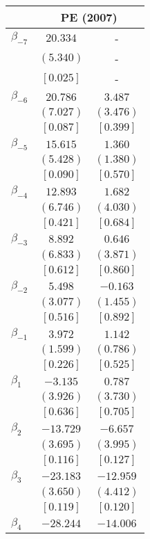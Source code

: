 \documentclass[12pt]{article}
\begin{document}
\begin{table}[htbp]
\centering
\label{tab:event_study_robustness_PE}
\begin{adjustbox}{scale=0.7}
\begin{tabular}{lcc}
\toprule
& \multicolumn{2}{c}{PE (2007)} \\
\cmidrule(lr){2-3}
\midrule
$\beta_{-7}$ & $ 20.334$ & - \\
& $(  5.340)$ & - \\
& $[  0.025]$ & - \\
$\beta_{-6}$ & $ 20.786$ & $  3.487$ \\
& $(  7.027)$ & $(  3.476)$ \\
& $[  0.087]$ & $[  0.399]$ \\
$\beta_{-5}$ & $ 15.615$ & $  1.360$ \\
& $(  5.428)$ & $(  1.380)$ \\
& $[  0.090]$ & $[  0.570]$ \\
$\beta_{-4}$ & $ 12.893$ & $  1.682$ \\
& $(  6.746)$ & $(  4.030)$ \\
& $[  0.421]$ & $[  0.684]$ \\
$\beta_{-3}$ & $  8.892$ & $  0.646$ \\
& $(  6.833)$ & $(  3.871)$ \\
& $[  0.612]$ & $[  0.860]$ \\
$\beta_{-2}$ & $  5.498$ & $ -0.163$ \\
& $(  3.077)$ & $(  1.455)$ \\
& $[  0.516]$ & $[  0.892]$ \\
$\beta_{-1}$ & $  3.972$ & $  1.142$ \\
& $(  1.599)$ & $(  0.786)$ \\
& $[  0.226]$ & $[  0.525]$ \\
$\beta_{1}$ & $ -3.135$ & $  0.787$ \\
& $(  3.926)$ & $(  3.730)$ \\
& $[  0.636]$ & $[  0.705]$ \\
$\beta_{2}$ & $-13.729$ & $ -6.657$ \\
& $(  3.695)$ & $(  3.995)$ \\
& $[  0.116]$ & $[  0.127]$ \\
$\beta_{3}$ & $-23.183$ & $-12.959$ \\
& $(  3.650)$ & $(  4.412)$ \\
& $[  0.119]$ & $[  0.120]$ \\
$\beta_{4}$ & $-28.244$ & $-14.006$ \\

\end{tabular}
\end{adjustbox}
\end{table}
\end{document}
